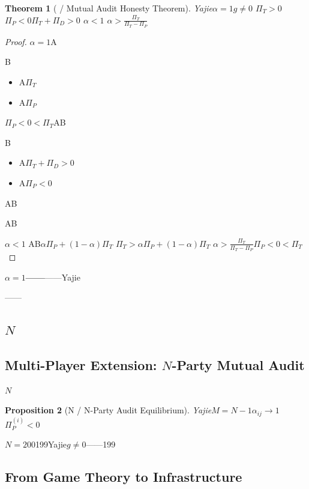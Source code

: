 \documentclass[12pt,a4paper]{article}
\newtheorem{theorem}{Theorem}[section]
\newtheorem{proposition}[theorem]{Proposition}
\theoremstyle{remark}
\begin{document}
\begin{theorem}[ / Mutual Audit Honesty Theorem]\label{thm:mutual_honesty}
    Yajie$\alpha = 1$$g \neq 0$
    $\Pi_T > 0$$\Pi_P < 0$$\Pi_T + \Pi_D > 0$
    $\alpha<1$
    $\alpha > \frac{\Pi_T}{\Pi_T - \Pi_P}$
\end{theorem}

\begin{proof}
    $\alpha=1$A
    
    B
    \begin{itemize}[nosep]
        \item A$\Pi_T$
        \item A$\Pi_P$
    \end{itemize}
    $\Pi_P < 0 < \Pi_T$AB

    B
    \begin{itemize}[nosep]
        \item A$\Pi_T + \Pi_D > 0$
        \item A$\Pi_P < 0$
    \end{itemize}
    AB

    AB
    

    $\alpha<1$
    AB$\alpha\Pi_P + (1-\alpha)\Pi_T$
    $\Pi_T > \alpha\Pi_P + (1-\alpha)\Pi_T$
    $\alpha > \frac{\Pi_T}{\Pi_T - \Pi_P}$$\Pi_P < 0 < \Pi_T$
\end{proof}

\textbf{$\alpha=1$——}——Yajie

\textbf{}\textbf{}——

\subsection{$N$ }
\subsection{Multi-Player Extension: $N$-Party Mutual Audit}

$N$

\begin{proposition}[N / N-Party Audit Equilibrium]
    Yajie$M = N-1$$\alpha_{ij} \to 1$$\Pi_P^{(i)} < 0$
\end{proposition}

$N=200$199Yajie$g \neq 0$——199

\subsection{}
\subsection{From Game Theory to Infrastructure}
\end{document}
